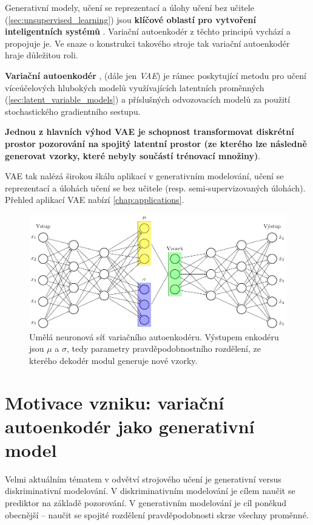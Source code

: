 Generativní modely, učení se reprezentací \cite{Bengio2014} a úlohy učení bez učitele (\autoref{sec:unsupervised_learning}) jsou \textbf{klíčové oblastí pro vytvoření inteligentních systémů} \cite{Kingma2019, LeCun2022}.
Variační autoenkodér z těchto principů vychází a propojuje je. Ve snaze o konstrukci takového stroje tak variační autoenkodér hraje důležitou roli.

\textbf{Variační autoenkodér} \cite{Kingma2014}, \cite{Rezende2014} (dále jen \emph{VAE})
je rámec poskytující metodu pro učení víceúčelových hlubokých modelů využívajících latentních proměnných (\autoref{sec:latent_variable_models})
a příslušných odvozovacích modelů
za použití stochastického gradientního sestupu. \cite{Kingma2019}

\textbf{Jednou z hlavních výhod VAE je schopnost transformovat \textbf{diskrétní prostor pozorování} na spojitý latentní prostor (ze kterého lze následně generovat vzorky, které nebyly součástí trénovací množiny)}.

VAE tak nalézá širokou škálu aplikací v generativním modelování, učení se reprezentací a úlohách učení se bez učitele (resp. semi-supervizovaných úlohách).
Přehled aplikací VAE nabízí \autoref{chap:applications}.

\begin{figure}[H]
    \includegraphics[width=\textwidth]{figures/vae.pdf}
    \caption{Umělá neuronová síť variačního autoenkodéru. Výstupem enkodéru jsou $\mu$ a $\sigma$, tedy parametry pravděpodobnostního rozdělení, ze kterého dekodér modul generuje nové vzorky.}
    \label{fig:vae_nn}
\end{figure}

\section{Motivace vzniku: variační autoenkodér jako generativní model}
Velmi aktuálním tématem v odvětví strojového učení je generativní versus diskriminativní modelování.
V diskriminativním modelování je cílem naučit se prediktor na základě pozorování.
V generativním modelování je cíl poněkud obecnější – naučit se spojité rozdělení pravděpodobnosti skrze všechny proměnné. \cite{Goodfellow2016}


